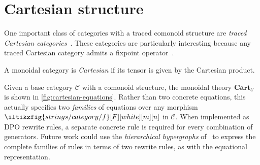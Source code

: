 \section{Cartesian structure}

One important class of categories with a traced comonoid structure are
\emph{traced Cartesian categories}~\cite{cazanescu1990new,hasegawa1997recursion}.
These categories are particularly interesting because any traced Cartesian
category admits a fixpoint operator~\cite[Thm. 3.1]{hasegawa1997recursion}.

\begin{definition}
    A monoidal category is \emph{Cartesian} if its tensor is given by the
    Cartesian product.
\end{definition}

Given a base category \(\mathcal{C}\) with a comonoid structure, the monoidal
theory \(\mathbf{Cart}_\mathcal{C}\) is shown in \cref{fig:cartesian-equations}.
Rather than two concrete equations, this actually specifies two \emph{families}
of equations over any morphism \(\iltikzfig{strings/category/f}[F][white][m][n]\)
in \(\mathcal{C}\).
When implemented as DPO rewrite rules, a separate concrete rule is required for
every combination of generators.
Future work could use the \emph{hierarchical hypergraphs}
of~\cite{alvarez-picallo2022rewriting} to express the complete families of rules
in terms of two rewrite rules, as with the equational representation.

